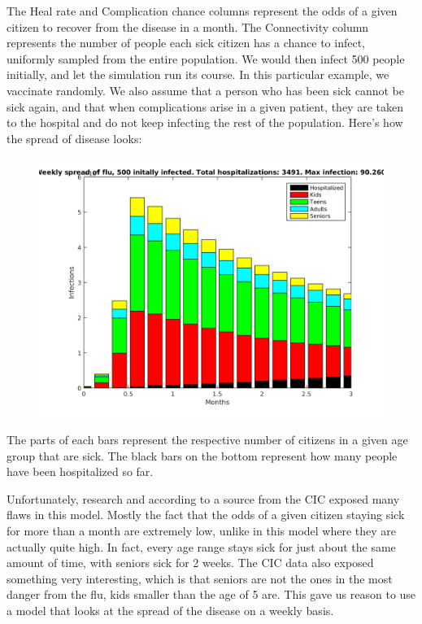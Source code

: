 \documentclass{article}
\begin{document}
\par The Heal rate and Complication chance columns represent the odds of a given citizen to recover from the disease in a month. The Connectivity column represents the number of people each sick citizen has a chance to infect, uniformly sampled from the entire population. We would then infect 500 people initially, and let the simulation run its course. In this particular example, we vaccinate randomly. We also assume that a person who has been sick cannot be sick again, and that when complications arise in a given patient, they are taken to the hospital and do not keep infecting the rest of the population. Here's how the spread of disease looks:
\begin{figure}[h!]
\includegraphics[width=\textwidth]{figures/Naive-model.png}
\end{figure}
The parts of each bars represent the respective number of citizens in a given age group that are sick. The black bars on the bottom represent how many people have been hospitalized so far.
\par Unfortunately, research and according to a source from the CIC \cite{CIC} exposed many flaws in this model. Mostly the fact that the odds of a given citizen staying sick for more than a month are extremely low, unlike in this model where they are actually quite high. In fact, every age range stays sick for just about the same amount of time, with seniors sick for 2 weeks. The CIC data also exposed something very interesting, which is that seniors are not the ones in the most danger from the flu, kids smaller than the age of 5 are. This gave us reason to use a model that looks at the spread of the disease on a weekly basis.
\end{document}
